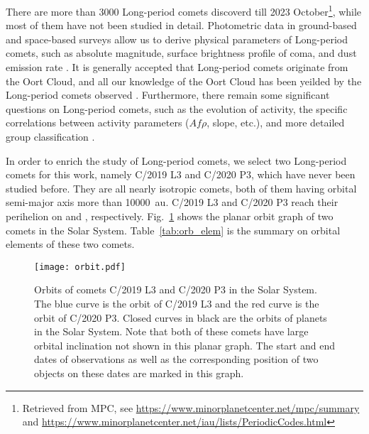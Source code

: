 There are more than \num{3000} Long-period comets discoverd till 2023 October\footnote{Retrieved from MPC, see \url{https://www.minorplanetcenter.net/mpc/summary} and \url{https://www.minorplanetcenter.net/iau/lists/PeriodicCodes.html}}, while most of them have not been studied in detail. Photometric data in ground-based and space-based surveys allow us to derive physical parameters of Long-period comets, such as absolute magnitude, surface brightness profile of coma, and dust emission rate \citep{bauer_comet_2022, betzler_activity_2023}. It is generally accepted that Long-period comets originate from the Oort Cloud, and all our knowledge of the Oort Cloud has been yeilded by the Long-period comets observed \citep{fouchard_what_2023}. Furthermore, there remain some significant questions on Long-period comets, such as the evolution of activity, the specific correlations between activity parameters ($Af\rho$, slope, etc.), and more detailed group classification \citep{sarneczky_activity_2016}. 

In order to enrich the study of Long-period comets, we select two Long-period comets for this work, namely C/2019 L3 and C/2020 P3, which  have never been studied before. They are all nearly isotropic comets, both of them having orbital semi-major axis more than {\qty{10000}{\astronomicalunit}}. C/2019 L3 and C/2020 P3 reach their perihelion on  and , respectively. Fig.~\ref{fig:orbit} shows the planar orbit graph of two comets in the Solar System. Table~\ref{tab:orb_elem} is the summary on orbital elements of these two comets. 

\begin{figure}
    \centering
    \texttt{[image: orbit.pdf]}
    \caption{Orbits of comets C/2019 L3 and C/2020 P3 in the Solar System. The blue curve is the orbit of C/2019 L3 and the red curve is the orbit of C/2020 P3. Closed curves in black are the orbits of planets in the Solar System. Note that both of these comets have large orbital inclination not shown in this planar graph. The start and end dates of observations as well as the corresponding position of two objects on these dates are marked in this graph. }
    \label{fig:orbit}
\end{figure}


